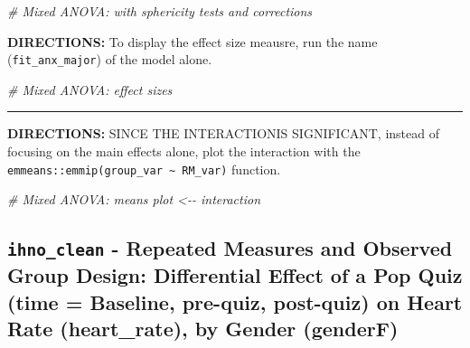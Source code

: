 \documentclass[
]{article}
\newenvironment{Shaded}{\begin{snugshade}}{\end{snugshade}}
\newcommand{\CommentTok}[1]{\textcolor[rgb]{0.56,0.35,0.01}{\textit{#1}}}
\begin{document}
\begin{Shaded}
\begin{Highlighting}[]
\CommentTok{\# Mixed ANOVA:  with sphericity tests and corrections}
\end{Highlighting}
\end{Shaded}

\clearpage

\textbf{DIRECTIONS:} To display the effect size meausre, run the name
(\texttt{fit\_anx\_major}) of the model alone.

\begin{Shaded}
\begin{Highlighting}[]
\CommentTok{\# Mixed ANOVA: effect sizes }
\end{Highlighting}
\end{Shaded}

\begin{center}\rule{0.5\linewidth}{0.5pt}\end{center}

\textbf{DIRECTIONS:} SINCE THE INTERACTIONIS SIGNIFICANT, instead of
focusing on the main effects alone, plot the interaction with the
\texttt{emmeans::emmip(group\_var\ \textasciitilde{}\ RM\_var)}
function.

\begin{Shaded}
\begin{Highlighting}[]
\CommentTok{\# Mixed ANOVA: means plot \textless{}{-}{-} interaction}
\end{Highlighting}
\end{Shaded}

\clearpage

\hypertarget{ihno_clean---repeated-measures-and-observed-group-design-differential-effect-of-a-pop-quiz-time-baseline-pre-quiz-post-quiz-on-heart-rate-heart_rate-by-gender-genderf}{%
\subsection{\texorpdfstring{\texttt{ihno\_clean} - Repeated Measures and
Observed Group Design: Differential Effect of a Pop Quiz (time =
Baseline, pre-quiz, post-quiz) on Heart Rate (heart\_rate), by Gender
(genderF)}{ihno\_clean - Repeated Measures and Observed Group Design: Differential Effect of a Pop Quiz (time = Baseline, pre-quiz, post-quiz) on Heart Rate (heart\_rate), by Gender (genderF)}}\label{ihno_clean---repeated-measures-and-observed-group-design-differential-effect-of-a-pop-quiz-time-baseline-pre-quiz-post-quiz-on-heart-rate-heart_rate-by-gender-genderf}}
\end{document}
